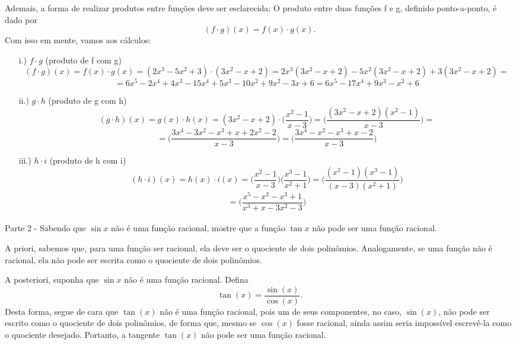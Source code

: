 \documentclass[exercícios_de_cálculo.tex]{subfiles}
\begin{document}
\begin{sol*}
	Ademais, a forma de realizar produtos entre funções deve ser esclarecida: O produto entre duas funções f e g, definido ponto-a-ponto, é dado por
	$$
		(f\cdot{g})(x) = f(x) \cdot{g(x)}.
	$$
	Com isso em mente, vamos aos cálculos:
	\begin{itemize}
		\item[i.)] $f\cdot{g}$ (produto de f com g)
		      $$
			      (f \cdot{g})(x) = f(x)\cdot{g(x)} = (2x^3 - 5x^2 + 3)\cdot(3x^2 - x + 2) = 2x^3(3x^2 - x + 2) - 5x^2 (3x^2 - x + 2) + 3(3x^2 - x + 2) =
		      $$
		      $$
			      = 6x^5 - 2x^4 + 4x^3 - 15x^4 + 5x^3 - 10x^2 + 9x^2 - 3x + 6 = 6x^5 - 17x^4 + 9x^3 - x^2 + 6
		      $$
		\item[ii.)]$g\cdot{h}$  (produto de g com h)
		      $$
			      (g\cdot{h})(x) = g(x)\cdot{h(x)} = (3x^2 - x + 2)\cdot\biggl(\frac{x^2 - 1}{x - 3}\biggr) = \biggl(\frac{(3x^2 - x + 2)(x^2 - 1)}{x - 3}\biggr) =
		      $$
		      $$
			      = \biggl(\frac{3x^4 - 3x^2 - x^3 + x + 2x^2 - 2}{x - 3}\biggr) = \biggl(\frac{3x^4 - x^2 - x^3 + x - 2}{x - 3}\biggr)
		      $$
		\item[iii.)]$h\cdot{i}$ (produto de h com i)
		      $$
			      (h\cdot{i})(x) = h(x)\cdot{i(x)} = \biggl(\frac{x^2 - 1}{x - 3}\biggr)\biggl(\frac{x^3 - 1}{x^2 + 1}\biggr) = \biggl(\frac{(x^2 - 1)(x^3 - 1)}{(x - 3)(x^2 + 1)}\biggr)
		      $$
		      $$
			      = \biggl(\frac{x^5 - x^2 -x^3 + 1}{x^3 + x - 3x^2 - 3}\biggr)
		      $$
	\end{itemize}
	\qedsymbol
\end{sol*}

\paragraph{}Parte 2 - Sabendo que $\sin{x}$ não é uma função racional, mostre que a funç\~ao $\tan{x}$ n\~ao pode ser uma funç\~ao racional.
\begin{proof*}
	A priori, sabemos que, para uma função ser racional, ela deve ser o quociente de dois polinômios. Analogamente, se uma função n\~ao é racional, ela n\~ao pode ser escrita como o quociente de dois polinômios.

	A posteriori, suponha que $\sin{x}$ não é uma função racional. Defina
	$$
		\tan(x) = \frac{\sin(x)}{\cos(x)}.
	$$
	Desta forma, segue de cara que $\tan(x)$ não é uma função racional, pois um de seus componentes, no caso, $\sin(x)$, n\~ao pode ser escrito como o quociente de dois polinômios, de forma que, mesmo se $\cos(x)$ fosse racional, ainda assim seria impossível escrevê-la como o quociente desejado. Portanto, a tangente $\tan(x)$ n\~ao pode ser uma funç\~ao racional.
	\qedsymbol
\end{proof*}
\end{document}
